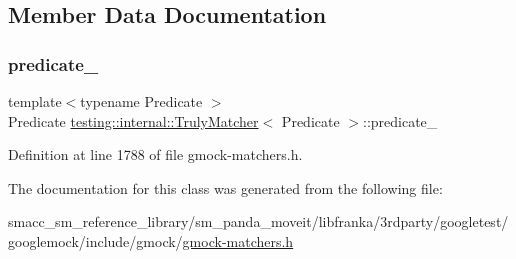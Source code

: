 \subsection{Member Data Documentation}
\mbox{\label{classtesting_1_1internal_1_1TrulyMatcher_a5697cfc685ae7c8c690838650bdd2d0c}} 
\subsubsection{\texorpdfstring{predicate\+\_\+}{predicate\_}}
{\footnotesize\ttfamily template$<$typename Predicate $>$ \\
Predicate \hyperlink{classtesting_1_1internal_1_1TrulyMatcher}{testing\+::internal\+::\+Truly\+Matcher}$<$ Predicate $>$\+::predicate\+\_\+\hspace{0.3cm}{\ttfamily [private]}}



Definition at line 1788 of file gmock-\/matchers.\+h.



The documentation for this class was generated from the following file\+:\begin{DoxyCompactItemize}
\item 
smacc\+\_\+sm\+\_\+reference\+\_\+library/sm\+\_\+panda\+\_\+moveit/libfranka/3rdparty/googletest/googlemock/include/gmock/\hyperlink{gmock-matchers_8h}{gmock-\/matchers.\+h}\end{DoxyCompactItemize}
